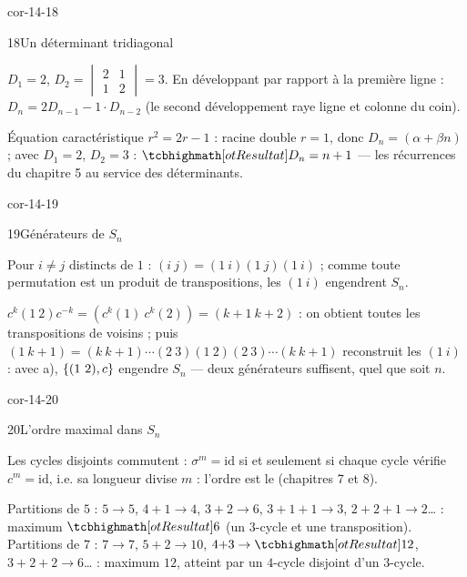\begin{blocLivre}{cor-14-18}
\begin{corrige}{18}{Un déterminant tridiagonal}
\begin{questions}
  \item $D_1=2$, $D_2=\begin{vmatrix}2&1\\1&2\end{vmatrix}=3$. En
    développant par rapport à la première ligne :
    $D_n=2D_{n-1}-1\cdot D_{n-2}$ (le second développement raye ligne et
    colonne du coin).
  \item Équation caractéristique $r^{2}=2r-1$ : racine double $r=1$, donc
    $D_n=(\alpha+\beta n)$ ; avec $D_1=2$, $D_2=3$ :
    $\res{D_n=n+1}$ — les récurrences du chapitre 5 au service des
    déterminants.
\end{questions}
\end{corrige}
\end{blocLivre}

\begin{blocLivre}{cor-14-19}
\begin{corrige}{19}{Générateurs de $S_n$}
\begin{questions}
  \item Pour $i\neq j$ distincts de $1$ :
    $(i\ j)=(1\ i)(1\ j)(1\ i)$ ; comme toute permutation est un produit
    de transpositions, les $(1\ i)$ engendrent $S_n$.
  \item $c^{k}(1\ 2)c^{-k}=(c^{k}(1)\ c^{k}(2))=(k{+}1\ k{+}2)$ : on
    obtient toutes les transpositions de voisins ; puis
    $(1\ k{+}1)=(k\ k{+}1)\cdots(2\ 3)(1\ 2)(2\ 3)\cdots(k\ k{+}1)$
    reconstruit les $(1\ i)$ : avec a), $\left\{(1\ 2),c\right\}$ engendre
    $S_n$ — deux générateurs suffisent, quel que soit $n$.
\end{questions}
\end{corrige}
\end{blocLivre}

\begin{blocLivre}{cor-14-20}
\begin{corrige}{20}{L'ordre maximal dans $S_n$}
\begin{questions}
  \item Les cycles disjoints commutent : $\sigma^{m}=\mathrm{id}$ si et
    seulement si chaque cycle vérifie $c^{m}=\mathrm{id}$, i.e. sa
    longueur divise $m$ : l'ordre est le
     (chapitres 7 et 8).
  \item Partitions de $5$ : $5\to5$, $4{+}1\to4$, $3{+}2\to6$,
    $3{+}1{+}1\to3$, $2{+}2{+}1\to2$… : maximum $\res{6}$ (un $3$-cycle
    et une transposition). Partitions de $7$ : $7\to7$, $5{+}2\to10$,
    $4{+}3\to\res{12}$, $3{+}2{+}2\to6$… : maximum $12$, atteint par un
    $4$-cycle disjoint d'un $3$-cycle.
\end{questions}
\end{corrige}
\end{blocLivre}


